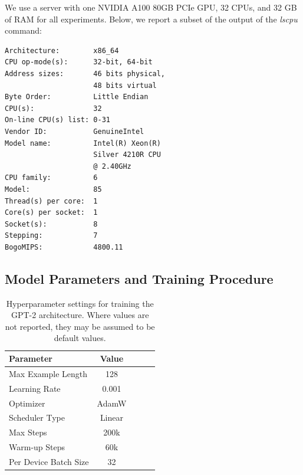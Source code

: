 We use a server with one NVIDIA A100 80GB PCIe GPU, 32 CPUs, and 32 GB of RAM for all experiments. Below, we report a subset of the output of the \emph{lscpu} command:

\begin{tcolorbox}[left=5pt,right=5pt,top=5pt,bottom=5pt]
\small
\begin{verbatim}
Architecture:        x86_64
CPU op-mode(s):      32-bit, 64-bit
Address sizes:       46 bits physical, 
                     48 bits virtual
Byte Order:          Little Endian
CPU(s):              32
On-line CPU(s) list: 0-31
Vendor ID:           GenuineIntel
Model name:          Intel(R) Xeon(R)
                     Silver 4210R CPU
                     @ 2.40GHz
CPU family:          6
Model:               85
Thread(s) per core:  1
Core(s) per socket:  1
Socket(s):           8
Stepping:            7
BogoMIPS:            4800.11
\end{verbatim}
\end{tcolorbox}

\subsection{Model Parameters and Training Procedure}

\begin{table}[!ht]
    \centering
    \small
    \begin{tabular}{lcccc}
    \toprule
         Parameter & Value \\
         \midrule
         Max Example Length & 128 \\
         Learning Rate & 0.001\\
         Optimizer & AdamW \\
         Scheduler Type & Linear\\
         Max Steps & 200k \\
         Warm-up Steps & 60k \\
         Per Device Batch Size & 32 \\
    \bottomrule
    \end{tabular}
    \caption{Hyperparameter settings for training the GPT-2 architecture. Where values are not reported, they may be assumed to be default values.}
    \label{tab:13-training_params}
\end{table}

